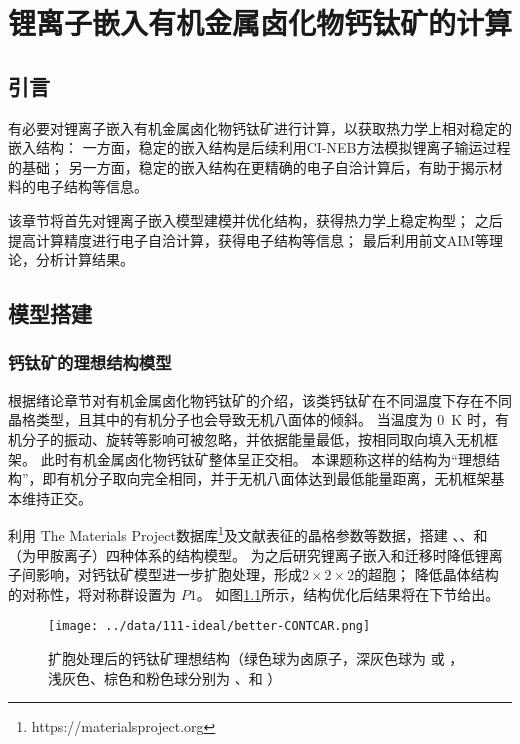 \chapter{锂离子嵌入有机金属卤化物钙钛矿的计算}
\label{ch:pos}

\section{引言}

有必要对锂离子嵌入有机金属卤化物钙钛矿进行计算，以获取热力学上相对稳定的嵌入结构：
一方面，稳定的嵌入结构是后续利用CI-NEB方法模拟锂离子输运过程的基础；
另一方面，稳定的嵌入结构在更精确的电子自洽计算后，有助于揭示材料的电子结构等信息。

该章节将首先对锂离子嵌入模型建模并优化结构，获得热力学上稳定构型；
之后提高计算精度进行电子自洽计算，获得电子结构等信息；
最后利用前文AIM等理论，分析计算结果。

\section{模型搭建}

\subsection{钙钛矿的理想结构模型}

根据绪论章节对有机金属卤化物钙钛矿的介绍，该类钙钛矿在不同温度下存在不同晶格类型，且其中的有机分子也会导致无机八面体的倾斜。
当温度为 \SI{0}{K} 时，有机分子的振动、旋转等影响可被忽略，并依据能量最低，按相同取向填入无机框架。
此时有机金属卤化物钙钛矿整体呈正交相。
本课题称这样的结构为“理想结构”，即有机分子取向完全相同，并于无机八面体达到最低能量距离，无机框架基本维持正交。

利用 The Materials Project数据库\footnote{https://materialsproject.org}及文献表征的晶格参数等数据，搭建 、、和  （为甲胺离子）四种体系的结构模型。
为之后研究锂离子嵌入和迁移时降低锂离子间影响，对钙钛矿模型进一步扩胞处理，形成$2\times2\times2$的超胞；
降低晶体结构的对称性，将对称群设置为 $P1$。
如图\ref{fig:ideal-struc}所示，结构优化后结果将在下节给出。

\begin{figure}[ht]
    \centering
    \texttt{[image: ../data/111-ideal/better-CONTCAR.png]}
    \caption{扩胞处理后的钙钛矿理想结构（绿色球为卤原子，深灰色球为 或 ，浅灰色、棕色和粉色球分别为 、和 ）}
    \label{fig:ideal-struc}
\end{figure}

